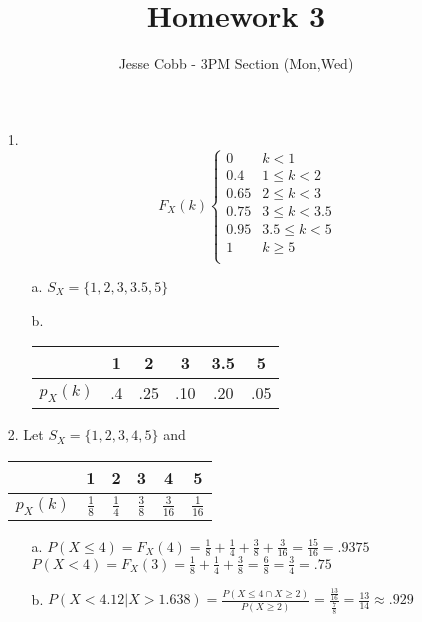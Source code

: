 \documentclass[11pt]{amsart}
\theoremstyle{definition}
\begin{document}
\title{Homework 3}

\author{Jesse Cobb - 3PM Section (Mon,Wed)}

\maketitle

\begin{itemize}

\item[1.]
\begin{equation*}
    F_X(k)
    \begin{cases}
        0    &k<1 \\
        0.4  &1\le k<2 \\
        0.65 &2\le k<3 \\
        0.75 &3\le k<3.5 \\
        0.95 &3.5\le k<5 \\
        1    &k\ge 5 \\
    \end{cases}
\end{equation*}
\begin{itemize}
    \item[a.] $S_X=\{1,2,3,3.5,5\}$

    \item[b.] \begin{tabular}{c|c|c|c|c|c}
                 & 1  & 2   & 3   & 3.5 & 5 \\
        \hline
        $p_X(k)$ & .4 & .25 & .10 & .20 & .05
    \end{tabular}
    
\end{itemize} 

\item[2.] Let $S_X=\{1,2,3,4,5\}$ and
\begin{tabular}{c|c|c|c|c|c}
                 & 1         & 2         & 3         & 4            & 5 \\
        \hline
        $p_X(k)$ & $\frac18$ & $\frac14$ & $\frac38$ & $\frac3{16}$ & $\frac1{16}$
    \end{tabular}
\begin{itemize}
    \item[a.] $P(X\le 4)=F_X(4)=\frac18+\frac14+\frac38+\frac3{16}=\frac{15}{16}=.9375$ \\
              $P(X< 4)=F_X(3)=\frac18+\frac14+\frac38=\frac 68=\frac 34=.75$ \\

    \item[b.] $P(X<4.12|X>1.638)=\frac{P(X\le 4 \cap X\ge 2)}{P(X\ge 2)}
               =\frac{\frac {13}{16}}{\frac 78}=\frac{13}{14}\approx .929$
    

\end{itemize}
\end{itemize}
\end{document}
